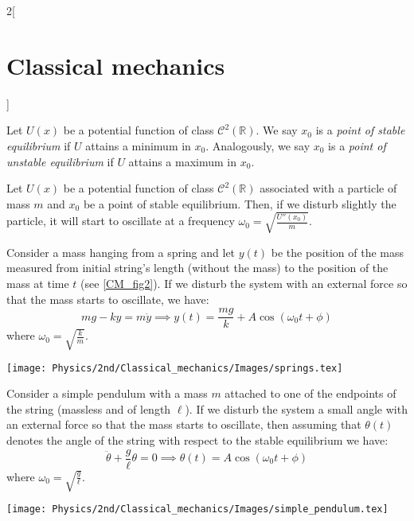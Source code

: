 \documentclass[../../../main.tex]{subfiles}
\begin{document}
\begin{multicols}{2}[\section{Classical mechanics}]
    \begin{definition}
        Let $U(x)$ be a potential function of class $\mathcal{C}^2(\mathbb{R})$. We say $x_0$ is a \textit{point of stable equilibrium} if $U$ attains a minimum in $x_0$. Analogously, we say $x_0$ is a \textit{point of unstable equilibrium} if $U$ attains a maximum in $x_0$.
    \end{definition}
    \begin{prop}
        Let $U(x)$ be a potential function of class $\mathcal{C}^2(\mathbb{R})$ associated with a particle of mass $m$ and $x_0$ be a point of stable equilibrium. Then, if we disturb slightly the particle, it will start to oscillate at a frequency $\omega_0=\sqrt{\frac{U''(x_0)}{m}}$.
    \end{prop}
    \begin{prop}
        Consider a mass hanging from a spring and let $y(t)$ be the position of the mass measured from initial string's length (without the mass) to the position of the mass at time $t$ (see \cref{CM_fig2}). If we disturb the system with an external force so that the mass starts to oscillate, we have: $$mg-ky=m\ddot{y}\implies y(t)=\frac{mg}{k}+A\cos(\omega_0t+\phi)$$ where $\omega_0=\sqrt{\frac{k}{m}}$.
        \begin{center}
            \begin{minipage}{\linewidth}
                \centering
                \texttt{[image: Physics/2nd/Classical\_mechanics/Images/springs.tex]}
                \label{CM_fig2}
            \end{minipage}
        \end{center}
    \end{prop}
    \begin{prop}
        Consider a simple pendulum with a mass $m$ attached to one of the endpoints of the string (massless and of length $\ell$). If we disturb the system a small angle with an external force so that the mass starts to oscillate, then assuming that $\theta(t)$ denotes the angle of the string with respect to the stable equilibrium we have:
        $$\ddot{\theta}+\frac{g}{\ell}\theta=0\implies\theta(t)=A\cos(\omega_0t+\phi)$$ where $\omega_0=\sqrt{\frac{g}{\ell}}$.
        \begin{center}
            \begin{minipage}{\linewidth}
                \centering
                \texttt{[image: Physics/2nd/Classical\_mechanics/Images/simple\_pendulum.tex]}

\end{minipage}
\end{center}
\end{prop}
\end{multicols}
\end{document}
